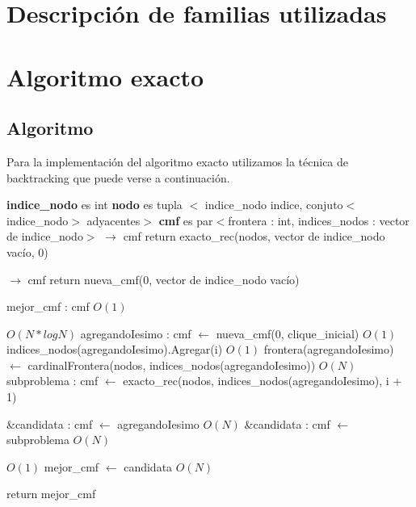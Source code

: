 \documentclass[a4paper, 10pt, twoside]{article}
\newenvironment{pseudo}[1][]{%
    \vspace{1em}%
    \begin{algorithmic}%
}
{%
    \end{algorithmic}%
    \vspace{1em}%
}
\newcommand{\Ode}[1]{\hfill $O(#1)$}
\begin{document}
\newpage
\section{Descripción de familias utilizadas}




\newpage

\section{Algoritmo exacto}
\subsection{Algoritmo}
Para la implementación del algoritmo exacto utilizamos la técnica de backtracking que puede verse a continuación.

\begin{pseudo}
\State \textbf{indice\_nodo} es int
\State \textbf{nodo} es tupla $<$ indice\_nodo indice, conjuto$<$indice\_nodo$>$ adyacentes$>$
\State \textbf{cmf} es par$<$frontera : int, indices\_nodos : vector de indice\_nodo$>$
\State
{} $\rightarrow$ cmf
	\State return exacto\_rec(nodos, vector de indice\_nodo vacío, 0)
\State
\EndProcedure

 $\rightarrow$ cmf
	 return nueva\_cmf(0, vector de indice\_nodo vacío) \EndIf

	\State mejor\_cmf : cmf									\Ode{1}

		 \Ode{N * log N}
			\State agregandoIesimo : cmf $\leftarrow$ nueva\_cmf(0, clique\_inicial)	\Ode{1}
			\State indices\_nodos(agregandoIesimo).Agregar(i)	\Ode{1}
			\State frontera(agregandoIesimo) $\leftarrow$
					cardinalFrontera(nodos, indices\_nodos(agregandoIesimo))	\Ode{N}
			\State subproblema : cmf $\leftarrow$
					exacto\_rec(nodos, indices\_nodos(agregandoIesimo), i + 1)

				\State \&candidata : cmf $\leftarrow$ agregandoIesimo			\Ode{N}
			\Else 
				\State \&candidata : cmf $\leftarrow$ subproblema				\Ode{N}
			\EndIf

			 \Ode{1}
				\State mejor\_cmf $\leftarrow$ candidata	\Ode{N}
			\EndIf
		\EndIf
	\EndFor

	\State return mejor\_cmf
\EndProcedure
\end{pseudo}
\end{document}
